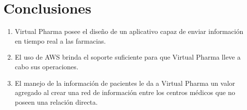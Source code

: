 \section*{Conclusiones}\label{sec:conclusiones}
\begin{enumerate}
\item Virtual Pharma posee el diseño de un aplicativo capaz de enviar información en tiempo real a las farmacias.
\item El uso de AWS brinda el soporte suficiente para que Virtual Pharma lleve a cabo sus operaciones.
\item El manejo de la información de pacientes le da a Virtual Pharma un valor agregado al crear una red de información entre los centros médicos que no poseen una relación directa.
\end{enumerate}
